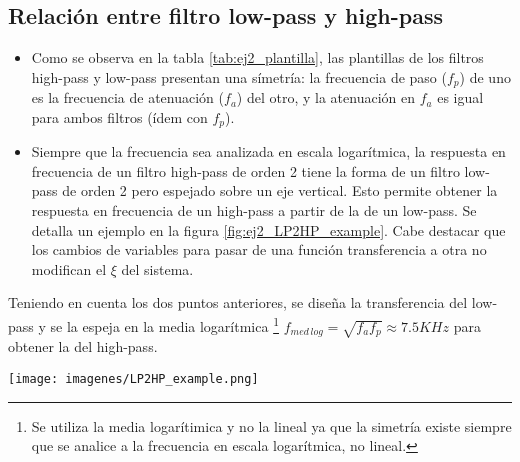 \subsection{Relaci\'on entre filtro low-pass y high-pass}

\begin{itemize}	%

	\item Como se observa en la tabla \ref{tab:ej2_plantilla}, las plantillas de los filtros high-pass y low-pass presentan una s\'imetr\'ia: la frecuencia de paso ($f_p$) de uno es la frecuencia de atenuaci\'on ($f_a$) del otro, y la atenuaci\'on en $f_a$ es igual para ambos filtros (\'idem con $f_p$). 
	
	\item Siempre que la frecuencia sea analizada en escala logar\'itmica, la respuesta en frecuencia de un filtro high-pass de orden 2 tiene la forma de un filtro low-pass de orden 2 pero espejado sobre un eje vertical. Esto permite obtener la respuesta en frecuencia de un high-pass a partir de la de un low-pass. Se detalla un ejemplo en la figura \ref{fig:ej2_LP2HP_example}. Cabe destacar que los cambios de variables para pasar de una funci\'on transferencia a otra no modifican el $\xi$ del sistema.

\end{itemize}

Teniendo en cuenta los dos puntos anteriores, se dise\~na la transferencia del low-pass y se la espeja en la media logar\'itmica 
\footnote{Se utiliza la media logar\'itimica y no la lineal ya que la simetr\'ia existe siempre que se analice a la frecuencia en escala logar\'itmica, no lineal.} 
$f_{med\, log}  = \sqrt{f_a f_p} \approx 7.5KHz$ para obtener la del high-pass.


\begin{figure*}	%
	\texttt{[image: imagenes/LP2HP\_example.png]}
	\caption[Ejemplo de trasformaci\'on de filtro low-pass a high-pass]{Trasformaci\'on de filtro low-pass a high-pass mediante inversi\'on en el eje de $3\, rad/s$. El primer cambio de variable mueve la transferencia de forma que el punto que estaba en $3\, rad/s$ se desplace hasta $1\, rad/s$ . El segundo espeja respecto el eje de $1\, rad/s$, y el tercero desplaza nuevamente a $3\, rad/s$. La funcion transferencia inicial es $H_{LP}(s) = \frac{1}{\frac{s^2}{4}+s+1}$, y la final $H_{HP}(s) = \frac{s^2\cdot \frac{4}{81}}{s^2\cdot \frac{4}{81}+s\cdot \frac{4}{9}+1}$. Notar que las frecuencias de corte ($2\, rad/s$ para el low-pass y $4.5\, rad/s$ para el high-pass) tambi\'en se espejan respecto al eje de $3\, rad/s$ y que $\xi=1$ no se modifica.}
	\label{fig:ej2_LP2HP_example}
\end{figure*}

